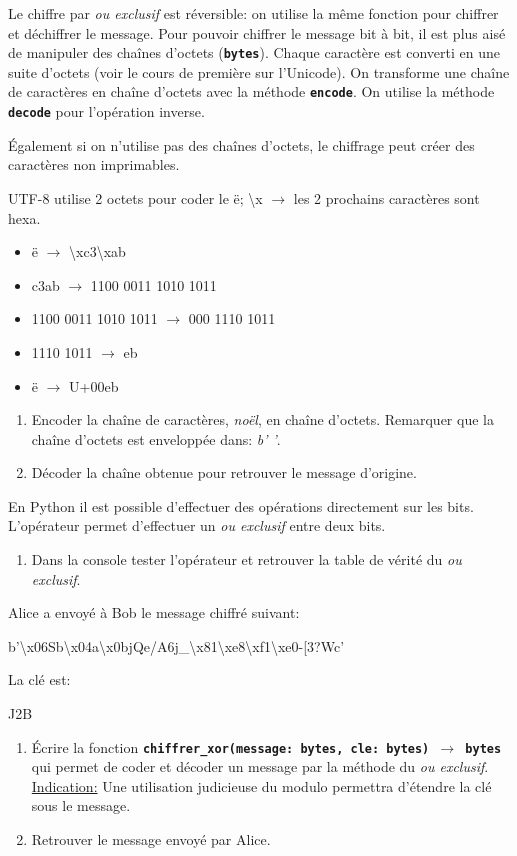 \documentclass[a4paper,11pt]{article}
\begin{document}
\begin{exo}
Le chiffre par \emph{ou exclusif} est réversible: on utilise la même fonction pour chiffrer et déchiffrer le message. Pour pouvoir chiffrer le message bit à bit, il est plus aisé de manipuler des chaînes d'octets (\textbf{\texttt{bytes}}). Chaque caractère est converti en une suite d'octets (voir le cours de première sur l'Unicode). On transforme une chaîne de caractères en chaîne d'octets avec la méthode \textbf{\texttt{encode}}. On utilise la méthode \textbf{\texttt{decode}} pour l'opération inverse.
\begin{commentprof}
Également si on n'utilise pas des chaînes d'octets, le chiffrage peut créer des caractères non imprimables.

UTF-8 utilise 2 octets pour coder le ë; \textbackslash x $\rightarrow$ les 2 prochains caractères sont hexa.
\begin{itemize}
    \item ë $\rightarrow$ \textbackslash xc3\textbackslash xab
    \item c3ab $\rightarrow$ 1100 0011 1010 1011
    \item 1100 0011 1010 1011 $\rightarrow$ 000 1110 1011
    \item 1110 1011 $\rightarrow$ eb
    \item ë $\rightarrow$ U+00eb
\end{itemize}
\end{commentprof}
\begin{enumerate}
    \item Encoder la chaîne de caractères, \emph{noël}, en chaîne d'octets. Remarquer que la chaîne d'octets est enveloppée dans: \emph{b' '}.
    \item Décoder la chaîne obtenue pour retrouver le message d'origine.
\end{enumerate}
En Python il est possible d'effectuer des opérations directement sur les bits. L'opérateur \wedge permet d'effectuer un \emph{ou exclusif} entre deux bits.
\begin{enumerate}[resume]
    \item Dans la console tester l'opérateur et retrouver la table de vérité du \emph{ou exclusif}.
\end{enumerate}
Alice a envoyé à Bob le message chiffré suivant:
\begin{center}
    b'\textbackslash x06Sb\textbackslash x04a\textbackslash x0bjQe/A6j\_\textbackslash x81\textbackslash xe8\textbackslash xf1\textbackslash xe0-[3?Wc'
\end{center}
La clé est:
\begin{center}
    J2B
\end{center}
\begin{enumerate}[resume]
    \item Écrire la fonction \textbf{\texttt{chiffrer\_xor(message: bytes, cle: bytes) $\rightarrow$ bytes}} qui permet de coder et décoder un message par la méthode du \emph{ou exclusif}. \underline{Indication:} Une utilisation judicieuse du modulo permettra d'étendre la clé sous le message.
    \item Retrouver le message envoyé par Alice.
\end{enumerate} 
\end{exo}
\end{document}
